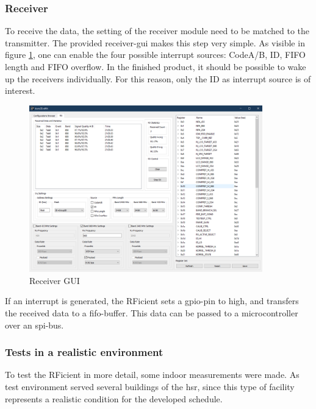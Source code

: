 \subsubsection{Receiver}
To receive the data, the setting of the receiver module need to be matched to the transmitter.
The provided receiver-\acs{gui} makes this step very simple.
As visible in figure \ref{development:rx}, one can enable the four possible interrupt sources: CodeA/B, ID, FIFO length and FIFO overflow.
In the finished product, it should be possible to wake up the receivers individually.
For this reason, only the ID as interrupt source is of interest.
\begin{figure}[ht]
	\centering
	\includegraphics[width=0.9\textwidth]{4-development/hardware/graphics/RXgui.png}
	\caption{Receiver GUI\label{development:rx}}
\end{figure}
If an interrupt is generated, the RFicient sets a \acs{gpio}-pin to high, and transfers the received data to a \acs{fifo}-buffer.
This data can be passed to a microcontroller over an \acs{spi}-bus.

\subsubsection{Tests in a realistic environment}
To test the RFicient in more detail, some indoor measurements were made.
As test environment served several buildings of the \acf{hsr}, since this type of facility represents a realistic condition for the developed schedule.

